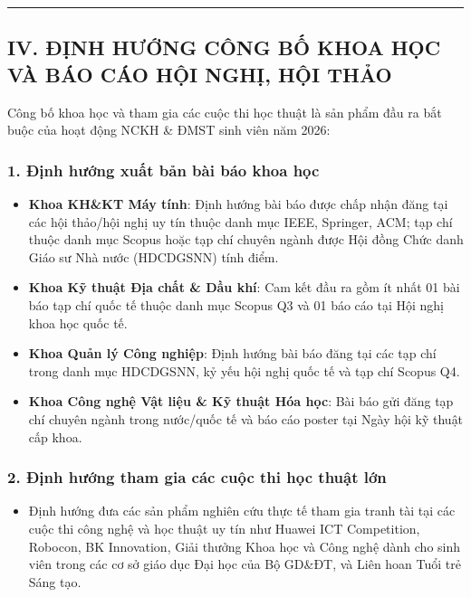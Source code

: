 \documentclass[11pt,a4paper]{article}
\providecommand{\tightlist}{%
  \setlength{\itemsep}{0pt}\setlength{\parskip}{0pt}}
\begin{document}
\begin{center}\rule{0.5\linewidth}{0.5pt}\end{center}

\subsection{IV. ĐỊNH HƯỚNG CÔNG BỐ KHOA HỌC VÀ BÁO CÁO HỘI NGHỊ, HỘI
THẢO}\label{iv.-ux111ux1ecbnh-hux1b0ux1edbng-cuxf4ng-bux1ed1-khoa-hux1ecdc-vuxe0-buxe1o-cuxe1o-hux1ed9i-nghux1ecb-hux1ed9i-thux1ea3o}

Công bố khoa học và tham gia các cuộc thi học thuật là sản phẩm đầu ra
bắt buộc của hoạt động NCKH \& ĐMST sinh viên năm 2026:

\subsubsection{1. Định hướng xuất bản bài báo khoa
học}\label{ux111ux1ecbnh-hux1b0ux1edbng-xuux1ea5t-bux1ea3n-buxe0i-buxe1o-khoa-hux1ecdc}

\begin{itemize}
\tightlist
\item
  \textbf{Khoa KH\&KT Máy tính}: Định hướng bài báo được chấp nhận đăng
  tại các hội thảo/hội nghị uy tín thuộc danh mục IEEE, Springer, ACM;
  tạp chí thuộc danh mục Scopus hoặc tạp chí chuyên ngành được Hội đồng
  Chức danh Giáo sư Nhà nước (HDCDGSNN) tính điểm.
\item
  \textbf{Khoa Kỹ thuật Địa chất \& Dầu khí}: Cam kết đầu ra gồm ít nhất
  01 bài báo tạp chí quốc tế thuộc danh mục Scopus Q3 và 01 báo cáo tại
  Hội nghị khoa học quốc tế.
\item
  \textbf{Khoa Quản lý Công nghiệp}: Định hướng bài báo đăng tại các tạp
  chí trong danh mục HDCDGSNN, kỷ yếu hội nghị quốc tế và tạp chí Scopus
  Q4.
\item
  \textbf{Khoa Công nghệ Vật liệu \& Kỹ thuật Hóa học}: Bài báo gửi đăng
  tạp chí chuyên ngành trong nước/quốc tế và báo cáo poster tại Ngày hội
  kỹ thuật cấp khoa.
\end{itemize}

\subsubsection{2. Định hướng tham gia các cuộc thi học thuật
lớn}\label{ux111ux1ecbnh-hux1b0ux1edbng-tham-gia-cuxe1c-cuux1ed9c-thi-hux1ecdc-thuux1eadt-lux1edbn}

\begin{itemize}
\tightlist
\item
  Định hướng đưa các sản phẩm nghiên cứu thực tế tham gia tranh tài tại
  các cuộc thi công nghệ và học thuật uy tín như Huawei ICT Competition,
  Robocon, BK Innovation, Giải thưởng Khoa học và Công nghệ dành cho
  sinh viên trong các cơ sở giáo dục Đại học của Bộ GD\&ĐT, và Liên hoan
  Tuổi trẻ Sáng tạo.
\end{itemize}
\end{document}

